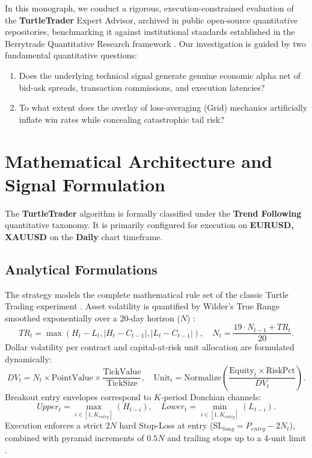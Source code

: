 \documentclass[11pt,a4paper]{article}
\begin{document}
In this monograph, we conduct a rigorous, execution-constrained evaluation of the \textbf{TurtleTrader} Expert Advisor, archived in public open-source quantitative repositories, benchmarking it against institutional standards established in the Berrytrade Quantitative Research framework \cite{artsu2026illusion}. Our investigation is guided by two fundamental quantitative questions:
\begin{enumerate}
    \item Does the underlying technical signal generate genuine economic alpha net of bid-ask spreads, transaction commissions, and execution latencies?
    \item To what extent does the overlay of loss-averaging (Grid) mechanics artificially inflate win rates while concealing catastrophic tail risk?
\end{enumerate}

\section{Mathematical Architecture and Signal Formulation}
The \textbf{TurtleTrader} algorithm is formally classified under the \textbf{Trend Following} quantitative taxonomy. It is primarily configured for execution on \textbf{EURUSD, XAUUSD} on the \textbf{Daily} chart timeframe.

\subsection{Analytical Formulations}

The strategy models the complete mathematical rule set of the classic Turtle Trading experiment \cite{faith2007way, donchian1960high}.
Asset volatility is quantified by Wilder's True Range smoothed exponentially over a 20-day horizon ($N$) \cite{wilder1978new}:
\begin{equation}
TR_t = \max\left(H_t - L_t, |H_t - C_{t-1}|, |L_t - C_{t-1}|\right), \quad N_t = \frac{19 \cdot N_{t-1} + TR_t}{20}.
\end{equation}
Dollar volatility per contract and capital-at-risk unit allocation are formulated dynamically:
\begin{equation}
DV_t = N_t \times \text{PointValue} \times \frac{\text{TickValue}}{\text{TickSize}}, \quad \text{Unit}_t = \text{Normalize}\left(\frac{\text{Equity}_t \times \text{RiskPct}}{DV_t}\right).
\end{equation}
Breakout entry envelopes correspond to $K$-period Donchian channels:
\begin{equation}
Upper_t = \max_{i \in [1, K_{entry}]} (H_{t-i}), \quad Lower_t = \min_{i \in [1, K_{entry}]} (L_{t-i}).
\end{equation}
Execution enforces a strict $2N$ hard Stop-Loss at entry ($\text{SL}_{long} = P_{entry} - 2N_t$), combined with pyramid increments of $0.5N$ and trailing stops up to a 4-unit limit \cite{moskowitz2012time, covel2009trend}.
\end{document}
